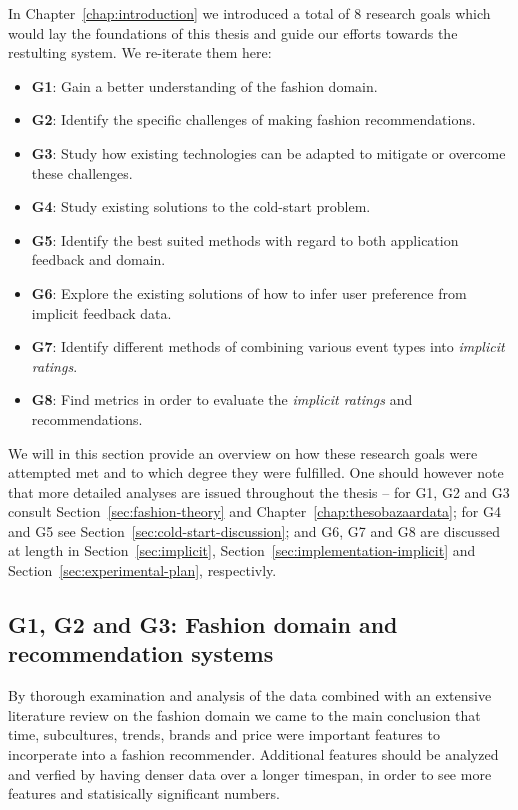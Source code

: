 In Chapter~\ref{chap:introduction} we introduced a total of 8 research goals
which would lay the foundations of this thesis and guide our efforts towards
the restulting system. We re-iterate them here:

\begin{itemize}
\item \textbf{G1}: Gain a better understanding of the fashion domain.
\item \textbf{G2}: Identify the specific challenges of making fashion recommendations.
\item \textbf{G3}: Study how existing technologies can be adapted to mitigate or
overcome these challenges.
\vfill
\item \textbf{G4}: Study existing solutions to the cold-start problem.
\item \textbf{G5}: Identify the best suited methods with regard to both application
feedback and domain.
\vfill
\item \textbf{G6}: Explore the existing solutions of how to infer user preference from
implicit feedback data.
\item \textbf{G7}: Identify different methods of combining various event types into
\textit{implicit ratings}.
\item \textbf{G8}: Find metrics in order to evaluate the \emph{implicit ratings} and
recommendations.
\end{itemize}

We will in this section provide an overview on how these research goals were
attempted met and to which degree they were fulfilled. One should however note
that more detailed analyses are issued throughout the thesis -- for G1, G2 and
G3 consult Section~\ref{sec:fashion-theory} and
Chapter~\ref{chap:thesobazaardata}; for G4 and G5 see
Section~\ref{sec:cold-start-discussion}; and G6, G7 and G8 are discussed at
length in Section~\ref{sec:implicit}, Section~\ref{sec:implementation-implicit} and
Section~\ref{sec:experimental-plan}, respectivly.

\subsection{G1, G2 and G3: Fashion domain and recommendation systems}
\label{sec:fashion-discussion}

By thorough examination and analysis of the data combined with an extensive
literature review on the fashion domain we came to the main conclusion that
time, subcultures, trends, brands and price were important features to
incorperate into a fashion recommender. Additional features should be analyzed
and verfied by having denser data over a longer timespan, in order to see
more features and statisically significant numbers.

